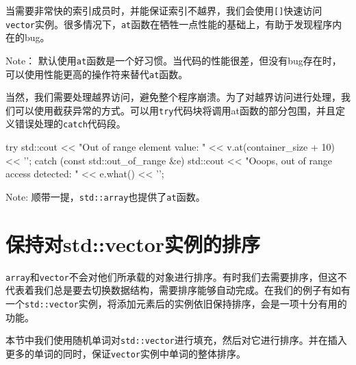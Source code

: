 当需要非常快的索引成员时，并能保证索引不越界，我们会使用\texttt{[]}快速访问\texttt{vector}实例。很多情况下，\texttt{at}函数在牺牲一点性能的基础上，有助于发现程序内在的bug。

\begin{myInfoBox}
Note： 默认使用\texttt{at}函数是一个好习惯。当代码的性能很差，但没有bug存在时，可以使用性能更高的操作符来替代\texttt{at}函数。
\end{myInfoBox}


当然，我们需要处理越界访问，避免整个程序崩溃。为了对越界访问进行处理，我们可以使用截获异常的方式。可以用\texttt{try}代码块将调用at函数的部分包围，并且定义错误处理的\texttt{catch}代码段。

\begin{codebox}[cpp]
try {
    std::cout << "Out of range element value: "
              << v.at(container_size + 10) << '\n';
} catch (const std::out_of_range &e) {
    std::cout << "Ooops, out of range access detected: "
              << e.what() << '\n';
}
\end{codebox}

\begin{myInfoBox}
Note: 顺带一提，\texttt{std::array}也提供了\texttt{at}函数。
\end{myInfoBox}


\section{保持对std::vector实例的排序}

\texttt{array}和\texttt{vector}不会对他们所承载的对象进行排序。有时我们去需要排序，但这不代表着我们总是要去切换数据结构，需要排序能够自动完成。在我们的例子有如有一个\texttt{std::vector}实例，将添加元素后的实例依旧保持排序，会是一项十分有用的功能。


本节中我们使用随机单词对\texttt{std::vector}进行填充，然后对它进行排序。并在插入更多的单词的同时，保证\texttt{vector}实例中单词的整体排序。

